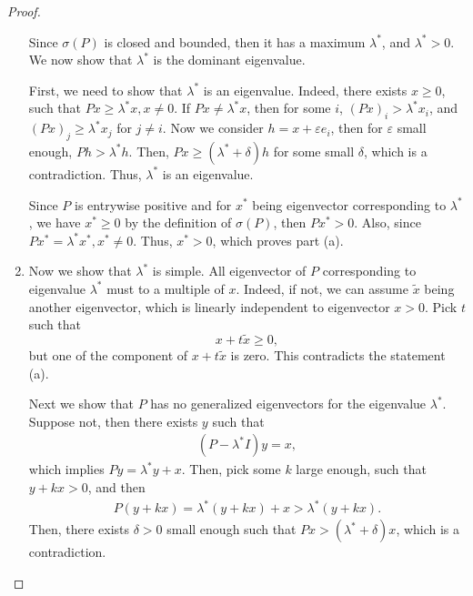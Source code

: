 \documentclass[11pt]{book}
\theoremstyle{definition}
\numberwithin{equation}{chapter}
\begin{document}
\begin{proof}
\begin{enumerate}[label=(\alph*)]
    Since $\sigma(P)$ is closed and bounded, then it has a maximum $\lambda^*$, and $\lambda^* > 0$. We now show that $\lambda^*$ is the dominant eigenvalue.
    
    First, we need to show that $\lambda^*$ is an eigenvalue. Indeed, there exists $x \geq 0$, such that $Px \geq \lambda^* x, x \neq 0$. If $Px \neq \lambda^* x$, then for some $i$, $(Px)_i > \lambda^* x_i$, and $(Px)_j \geq \lambda^* x_j$ for $j \neq i$. Now we consider $h = x + \varepsilon e_i$, then for $\varepsilon$ small enough, $Ph > \lambda^* h$. Then, $Px \geq (\lambda^* + \delta) h$ for some small $\delta$, which is a contradiction. Thus, $\lambda^*$ is an eigenvalue.
    
    Since $P$ is entrywise positive and for $x^*$ being eigenvector corresponding to $\lambda^*$, we have $x^* \geq 0$ by the definition of $\sigma(P)$, then $Px^* > 0$. Also, since $Px^* = \lambda^* x^*, x^* \neq 0$. Thus, $x^* > 0$, which proves part (a).
    
    \item Now we show that $\lambda^*$ is simple. All eigenvector of $P$ corresponding to eigenvalue $\lambda^*$ must to a multiple of $x$. Indeed, if not, we can assume $\widetilde{x}$ being another eigenvector, which is linearly independent to eigenvector $x > 0$. Pick $t$ such that 
    $$x + t \widetilde{x} \geq 0,$$
    but one of the component of $x + t \widetilde{x}$ is zero. This contradicts the statement (a).
    
    Next we show that $P$ has no generalized eigenvectors for the eigenvalue $\lambda^*$. Suppose not, then there exists $y$ such that 
    \begin{align*}
        (P - \lambda^* I)y = x,
    \end{align*}
    which implies $Py = \lambda^* y + x$. Then, pick some $k$ large enough, such that $y + kx > 0$, and then
    \begin{align*}
        P(y + kx) = \lambda^*(y + kx) + x > \lambda^* (y + kx).
    \end{align*}
    Then, there exists $\delta > 0$ small enough such that $Px > \left(\lambda^* + \delta\right)x$, which is a contradiction.
    

\end{enumerate}
\end{proof}
\end{document}
